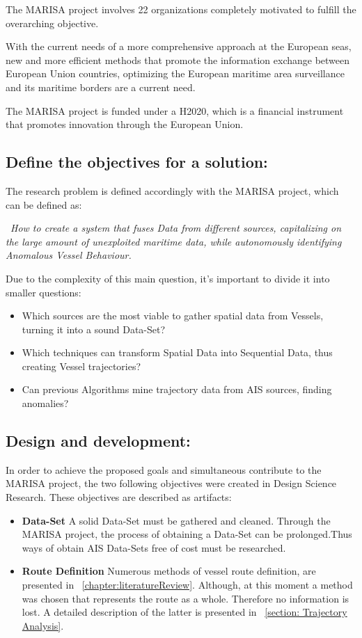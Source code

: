 The MARISA project involves 22 organizations completely motivated to fulfill the overarching objective. 

With the current needs of a more comprehensive approach at the European seas, new and more efficient methods that promote the information exchange between European Union countries, optimizing the European maritime area surveillance and its maritime borders are a current need.

The MARISA project is funded under a H2020, which is a financial instrument that promotes innovation through the European Union.

\subsection{Define the objectives for a solution:}
The research problem is defined accordingly with the MARISA project, which can be defined as: 

~\textit{How to create a system that fuses Data from different sources, capitalizing on the large amount of unexploited maritime data, while autonomously identifying Anomalous Vessel Behaviour.}  

Due to the complexity of this main question, it's important to divide it into smaller questions:

\begin{itemize}
\item Which sources are the most viable to gather spatial data from Vessels,
turning it into a sound Data-Set?
\item Which techniques can transform Spatial Data into Sequential Data, thus creating Vessel trajectories?
\item Can previous Algorithms mine trajectory data from AIS sources, finding anomalies?
\end{itemize}

\subsection{Design and development:} In order to achieve the proposed goals and simultaneous contribute to the MARISA project, the two following objectives were created in Design Science Research. These objectives are described as artifacts:

\begin{itemize}
\item \textbf{Data-Set} A solid Data-Set must be gathered and cleaned. Through the MARISA project, the process of obtaining a Data-Set can be prolonged.Thus ways of obtain AIS Data-Sets free of cost must be researched.

\item \textbf{Route Definition} Numerous methods of vessel route definition, are presented in ~\ref{chapter:literatureReview}.
Although, at this moment a method was chosen that represents the route as a whole. Therefore no information is lost. A detailed description of the latter is presented in ~\ref{section: Trajectory Analysis}.
\end{itemize}


